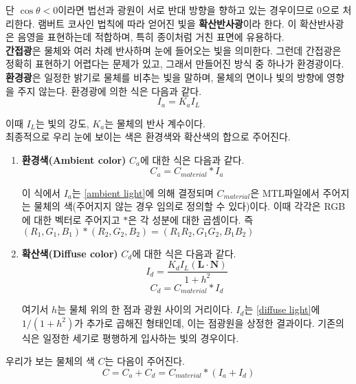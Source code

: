 \documentclass[10pt]{gshs-report-v2.0}
\theoremstyle{theorem}
\theoremstyle{lemma}
\theoremstyle{definition}
\begin{document}
단 $\cos\theta<0$이라면 법선과 광원이 서로 반대 방향을 향하고 있는 경우이므로 0으로 처리한다. 램버트 코사인 법칙에 따라 얻어진 빛을 \textbf{확산반사광}이라 한다. 이 확산반사광은 음영을 표현하는데 적합하며, 특히 종이처럼 거친 표면에 유용하다.\cite{lambert}\\

\textbf{간접광}은 물체와 여러 차례 반사하며 눈에 들어오는 빛을 의미한다. 그런데 간접광은 정확히 표현하기 어렵다는 문제가 있고, 그래서 만들어진 방식 중 하나가 환경광이다. \textbf{환경광}은 일정한 밝기로 물체를 비추는 빛을 말하며, 물체의 면이나 빛의 방향에 영향을 주지 않는다. 환경광에 의한 식은 다음과 같다.
\begin{equation} \label{ambient light}
	I_a=K_aI_L
\end{equation}

이때 $I_L$는 빛의 강도, $K_a$는 물체의 반사 계수이다. \\

최종적으로 우리 눈에 보이는 색은 환경색와 확산색의 합으로 주어진다.
\begin{enumerate}
\item \textbf{환경색(Ambient color)} $C_a$에 대한 식은 다음과 같다.
\begin{equation} \label{ambient color}
	C_a=C_{material}*I_a
\end{equation}

이 식에서 $I_a$는 \cref{ambient light}에 의해 결정되며 $C_{material}$은 MTL파일에서 주어지는 물체의 색\footnotesize(주어지지 않는 경우 임의로 정의할 수 있다)\normalsize 이다. 이때 각각은 RGB에 대한 벡터로 주어지고 $*$은 각 성분에 대한 곱셈이다. 즉 $(R_1, G_1, B_1)*(R_2, G_2, B_2)=(R_1R_2, G_1G_2, B_1B_2)$

\item \textbf{확산색(Diffuse color)} $C_d$에 대한 식은 다음과 같다.
\begin{equation*} 
	I_d=\frac{K_dI_L(\mathbf{L}\cdot\mathbf{N})}{1+h^2}
\end{equation*}
\begin{equation} \label{diffuse color}
	C_d=C_{material}*I_d
\end{equation}

여기서 $h$는 물체 위의 한 점과 광원 사이의 거리이다. $I_d$는 \cref{diffuse light}에 $1/(1+h^2)$가 추가로 곱해진 형태인데, 이는 점광원을 상정한 결과이다. 기존의 식은 일정한 세기로 평행하게 입사하는 빛의 경우이다. 
\end{enumerate}

우리가 보는 물체의 색 $C$는 다음이 주어진다. 
\begin{equation*}
	C=C_a+C_d=C_{material}*(I_a+I_d)
\end{equation*}
\end{document}
